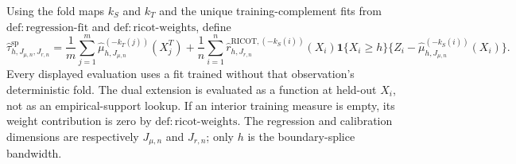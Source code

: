 Using the fold maps \(k_S\) and \(k_T\) and the unique training-complement fits from \(\mathrm{def:regression\text{-}fit}\) and \(\mathrm{def:ricot\text{-}weights}\), define
\[
\widehat\tau^{\mathrm{sp}}_{h,J_{\mu,n},J_{r,n}}=
\frac1m\sum_{j=1}^m\widehat\mu_{h,J_{\mu,n}}^{(-k_T(j))}(X_j^T)
+\frac1n\sum_{i=1}^n\widehat r^{\mathrm{RICOT},(-k_S(i))}_{h,J_{r,n}}(X_i)\mathbf 1\{X_i\ge h\}\{Z_i-\widehat\mu_{h,J_{\mu,n}}^{(-k_S(i))}(X_i)\}.
\]
Every displayed evaluation uses a fit trained without that observation's deterministic fold. The dual extension is evaluated as a function at held-out \(X_i\), not as an empirical-support lookup. If an interior training measure is empty, its weight contribution is zero by \(\mathrm{def:ricot\text{-}weights}\). The regression and calibration dimensions are respectively \(J_{\mu,n}\) and \(J_{r,n}\); only \(h\) is the boundary-splice bandwidth.